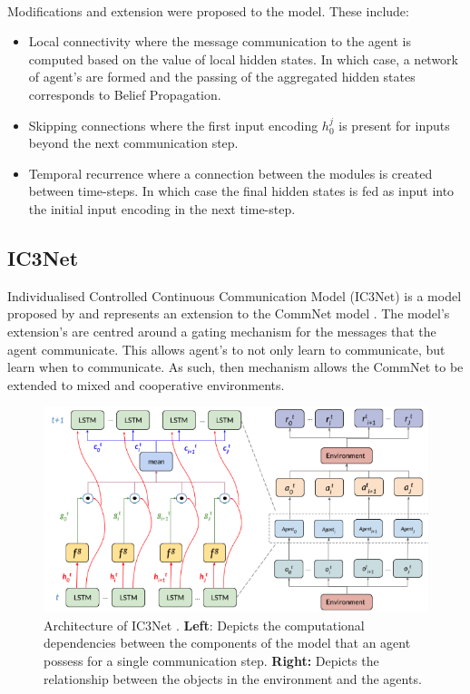 \documentclass{article}
\begin{document}
\

Modifications and extension were proposed to the model. These include:
\begin{itemize}
	\item Local connectivity where the message communication to the agent is computed based on the value of local hidden states. In which case, a network of agent's are formed and the passing of the aggregated hidden states corresponds to Belief Propagation. \citep{pearl1982bayes}
	\item Skipping connections where the first input encoding $h_0^j$ is present for inputs beyond the next communication step.
	\item Temporal recurrence where a connection between the modules is created between time-steps. In which case the final hidden states is fed as input into the initial input encoding in the next time-step. 
\end{itemize}

\subsection{IC3Net}

Individualised Controlled Continuous Communication Model (IC3Net) is a model proposed by \citet{singh2018ic3net} and represents an extension to the CommNet model \citep{sukhbaatar2016commnet}. The model's extension's are centred around a gating mechanism for the messages that the agent communicate. This allows agent's to not only learn to communicate, but learn when to communicate. As such, then mechanism allows the CommNet \citep{sukhbaatar2016commnet} to be extended to mixed and cooperative environments. 

\begin{figure}
	\centering
	\includegraphics[scale=0.5]{images/ic3net.png}
	\caption{Architecture of IC3Net \citep{singh2018ic3net}. \textbf{Left}: Depicts the computational dependencies between the components of the model that an agent possess for a single communication step. \textbf{Right:} Depicts the relationship between the objects in the environment and the agents.}
	\label{fig:ic3net.png}
\end{figure}
\end{document}
